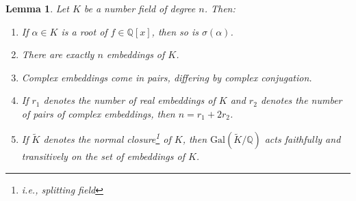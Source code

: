 \documentclass[12pt]{amsart}
\newtheorem{lemma}[theorem]{Lemma}
\theoremstyle{definition} \newtheorem*{notation}{Notation}
\theoremstyle{remark} \newtheorem*{remark}{Remark}
\theoremstyle{remark} \newtheorem*{example}{Example}
\theoremstyle{definition} \newtheorem*{definition}{Definition}
\numberwithin{equation}{section}
\numberwithin{theorem}{section}
\begin{document}
	\begin{lemma}\label{lem:embedding-props}
		Let $K$ be a number field of degree $n$.  Then:
		\begin{enumerate}
			\item If $\alpha \in K$ is a root of $f \in \mathbb{Q}[x]$, then so is $\sigma(\alpha)$.
			\item There are exactly $n$ embeddings of $K$.
			\item Complex embeddings come in pairs, differing by complex conjugation.  
			\item If $r_1$ denotes the number of real embeddings of $K$ and $r_2$ denotes the number of pairs of complex embeddings, then $n=r_1+2r_2$.
			\item If $\widetilde{K}$ denotes the normal closure\footnote{i.e., splitting field} of $K$, then $\mathrm{Gal}(\widetilde{K}/\mathbb{Q})$ acts faithfully and transitively on the set of embeddings of $K$.
		\end{enumerate}
	\end{lemma}
\end{document}
